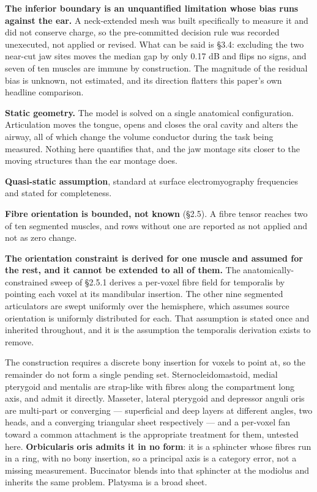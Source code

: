 \documentclass[
  11pt,
  letterpaper,
]{article}
\begin{document}
\textbf{The inferior boundary is an unquantified limitation whose bias runs against
the ear.} A neck-extended mesh was built specifically to measure it and did not
conserve charge, so the pre-committed decision rule was recorded unexecuted, not
applied or revised. What can be said is \S{}3.4: excluding the two near-cut jaw
sites moves the median gap by only \textminus{}0.17 dB and flips no signs, and seven of ten
muscles are immune by construction. The magnitude of the residual bias is
unknown, not estimated, and its direction flatters this paper's own headline
comparison.

\textbf{Static geometry.} The model is solved on a single anatomical configuration.
Articulation moves the tongue, opens and closes the oral cavity and alters the
airway, all of which change the volume conductor during the task being measured.
Nothing here quantifies that, and the jaw montage sits closer to the moving
structures than the ear montage does.

\textbf{Quasi-static assumption}, standard at surface electromyography frequencies
and stated for completeness.

\textbf{Fibre orientation is bounded, not known} (\S{}2.5). A fibre tensor reaches two
of ten segmented muscles, and rows without one are reported as not applied and
not as zero change.

\textbf{The orientation constraint is derived for one muscle and assumed for the rest,
and it cannot be extended to all of them.} The anatomically-constrained sweep of
\S{}2.5.1 derives a per-voxel fibre field for temporalis by pointing each voxel at
its mandibular insertion. The other nine segmented articulators are swept
uniformly over the hemisphere, which assumes source orientation is uniformly
distributed for each. That assumption is stated once and inherited throughout,
and it is the assumption the temporalis derivation exists to remove.

The construction requires a discrete bony insertion for voxels to point at, so
the remainder do not form a single pending set. Sternocleidomastoid, medial
pterygoid and mentalis are strap-like with fibres along the compartment long
axis, and admit it directly. Masseter, lateral pterygoid and depressor anguli
oris are multi-part or converging --- superficial and deep layers at different
angles, two heads, and a converging triangular sheet respectively --- and a
per-voxel fan toward a common attachment is the appropriate treatment for them,
untested here. \textbf{Orbicularis oris admits it in no form}: it is a sphincter
whose fibres run in a ring, with no bony insertion, so a principal axis is a
category error, not a missing measurement. Buccinator blends into that sphincter
at the modiolus and inherits the same problem. Platysma is a broad sheet.
\end{document}
